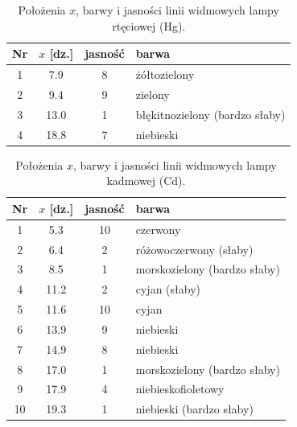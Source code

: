 \documentclass[12pt, a4paper]{article}
\begin{document}
\begin{table}[H]
    \centering
    \caption{Położenia $x$, barwy i jasności linii widmowych lampy rtęciowej (Hg).}\label{tab:raw_hg}
    \begin{tabular}{c S[table-format=2.1] S[table-format=2.0] l}
        \toprule
        Nr & {$x$ [dz.]} & {jasność} & barwa \\
         & 7.9 & 8 & żółtozielony \\
        2 & 9.4 & 9 & zielony \\
        3 & 13.0 & 1 & błękitnozielony (bardzo słaby) \\
        4 & 18.8 & 7 & niebieski \\
        \bottomrule
    \end{tabular}
\end{table}

\begin{table}[H]
    \centering
    \caption{Położenia $x$, barwy i jasności linii widmowych lampy kadmowej (Cd).}\label{tab:raw_cd}
    \begin{tabular}{c S[table-format=2.1] S[table-format=2.0] l}
        \toprule
        Nr & {$x$ [dz.]} & {jasność} & barwa \\
         & 5.3 & 10 & czerwony \\
        2 & 6.4 & 2 & różowoczerwony (słaby) \\
        3 & 8.5 & 1 & morskozielony (bardzo słaby) \\
        4 & 11.2 & 2 & cyjan (słaby) \\
        5 & 11.6 & 10 & cyjan \\
        6 & 13.9 & 9 & niebieski \\
        7 & 14.9 & 8 & niebieski \\
        8 & 17.0 & 1 & morskozielony (bardzo słaby) \\
        9 & 17.9 & 4 & niebieskofioletowy \\
        10 & 19.3 & 1 & niebieski (bardzo słaby) \\
        \bottomrule
    \end{tabular}
\end{table}
\end{document}
